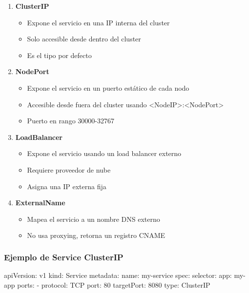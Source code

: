\documentclass[11pt,a4paper]{article}
\begin{document}
\begin{enumerate}
    \item \textbf{\textcolor{k8sblue}{ClusterIP}}
    \begin{itemize}
        \item Expone el servicio en una IP interna del cluster
        \item Solo accesible desde dentro del cluster
        \item Es el tipo por defecto
    \end{itemize}
    
    \item \textbf{\textcolor{k8ssuccess}{NodePort}}
    \begin{itemize}
        \item Expone el servicio en un puerto estático de cada nodo
        \item Accesible desde fuera del cluster usando <NodeIP>:<NodePort>
        \item Puerto en rango 30000-32767
    \end{itemize}
    
    \item \textbf{\textcolor{k8swarning}{LoadBalancer}}
    \begin{itemize}
        \item Expone el servicio usando un load balancer externo
        \item Requiere proveedor de nube
        \item Asigna una IP externa fija
    \end{itemize}
    
    \item \textbf{\textcolor{k8ssteelblue}{ExternalName}}
    \begin{itemize}
        \item Mapea el servicio a un nombre DNS externo
        \item No usa proxying, retorna un registro CNAME
    \end{itemize}
\end{enumerate}

\subsubsection{Ejemplo de Service ClusterIP}

\begin{commandbox}
apiVersion: v1
kind: Service
metadata:
  name: my-service
spec:
  selector:
    app: my-app
  ports:
    - protocol: TCP
      port: 80
      targetPort: 8080
  type: ClusterIP
\end{commandbox}
\end{document}
